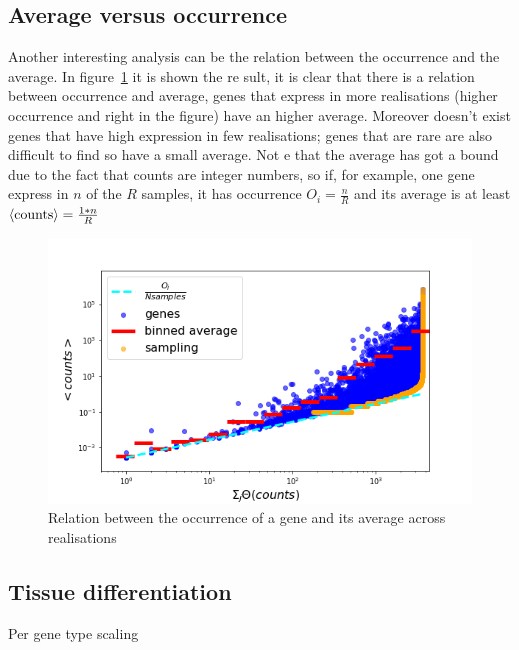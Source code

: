 \subsection{Average versus occurrence}
Another interesting analysis can be the relation between the occurrence and the average. In figure~\ref{fig:scalinglaws/gtex/meanDiff_binned_sampling} it is shown the re
sult, it is clear that there is a relation between occurrence and average, genes that express in more realisations (higher occurrence and right in the figure) have an
higher average. Moreover doesn't exist genes that have high expression in few realisations; genes that are rare are also difficult to find so have a small average. Not
e that the average has got a bound due to the fact that counts are integer numbers, so if, for example, one gene express in $n$ of the $R$ samples, it has occurrence $
O_i=\frac{n}{R}$ and its average is at least $\left\langle \mathrm{counts}\right\rangle=\frac{1*n}{R}$
\begin{figure}[htb!]
    \centering
    \includegraphics[width=0.9\linewidth]{pictures/scalinglaws/gtex/meanDiff_binned_sampling.png}
    \caption{Relation between the occurrence of a gene and its average across realisations}
    \label{fig:scalinglaws/gtex/meanDiff_binned_sampling}
\end{figure}

\subsection{Tissue differentiation}
Per gene type scaling
